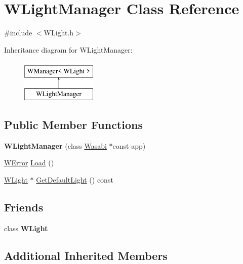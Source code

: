 \hypertarget{class_w_light_manager}{}\section{W\+Light\+Manager Class Reference}
\label{class_w_light_manager}


{\ttfamily \#include $<$W\+Light.\+h$>$}

Inheritance diagram for W\+Light\+Manager\+:\begin{figure}[H]
\begin{center}
\leavevmode
\includegraphics[height=2.000000cm]{class_w_light_manager}
\end{center}
\end{figure}
\subsection*{Public Member Functions}
\begin{DoxyCompactItemize}
\item 
{\bfseries W\+Light\+Manager} (class \hyperlink{class_wasabi}{Wasabi} $\ast$const app)\hypertarget{class_w_light_manager_a383f586c8fcb081644acff7a6e309723}{}\label{class_w_light_manager_a383f586c8fcb081644acff7a6e309723}

\item 
\hyperlink{class_w_error}{W\+Error} \hyperlink{class_w_light_manager_a598a2b52278b60938349a1ca49cabc38}{Load} ()
\item 
\hyperlink{class_w_light}{W\+Light} $\ast$ \hyperlink{class_w_light_manager_a3938a907d933a66ed0e83558d452aa50}{Get\+Default\+Light} () const 
\end{DoxyCompactItemize}
\subsection*{Friends}
\begin{DoxyCompactItemize}
\item 
class {\bfseries W\+Light}\hypertarget{class_w_light_manager_a6b1576d062038d86d5d5032924d61e48}{}\label{class_w_light_manager_a6b1576d062038d86d5d5032924d61e48}

\end{DoxyCompactItemize}
\subsection*{Additional Inherited Members}


